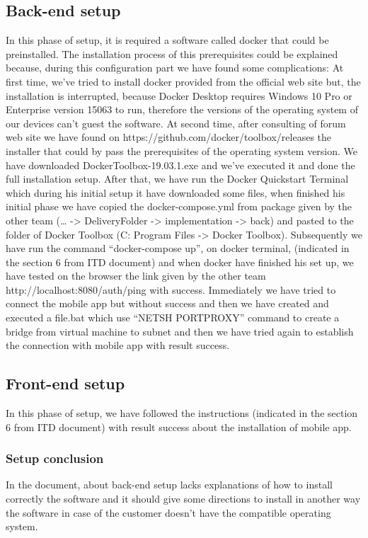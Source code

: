 \subsection{Back-end setup}
In this phase of setup, it is required a software called docker that could be preinstalled. The installation process of this prerequisites could be explained because, during this configuration part we have found some complications: 
At first time, we’ve tried to install docker provided from the official web site but, the installation is interrupted, because Docker Desktop requires Windows 10 Pro or Enterprise version 15063 to run, therefore the versions of the operating system of our devices can’t guest the software. At second time, after consulting of forum web site we have found on https://github.com/docker/toolbox/releases the installer that could by pass the prerequisites of the operating system version. We have downloaded DockerToolbox-19.03.1.exe and we’ve executed it and done the full installation setup. After that, we have run the Docker Quickstart Terminal which during his initial setup it have downloaded some files, when finished his initial phase we have copied the docker-compose.yml from package given by the other team (… -> DeliveryFolder -> implementation -> back) and pasted to the folder of Docker Toolbox (C: Program Files -> Docker Toolbox). Subsequently  we have run the command “docker-compose up”, on docker terminal, (indicated in the section 6 from ITD document) and when docker have finished his set up, we have tested on the browser the link given by the other team http://localhost:8080/auth/ping with success.  Immediately we have tried to connect the mobile app but without success and then we have created and executed a file.bat which use “NETSH PORTPROXY” command to create a bridge from virtual machine to subnet and then we have tried again to establish the connection with mobile app with result success.

\subsection{Front-end setup}
In this phase of setup, we have followed the instructions (indicated in the section 6 from ITD document) with result success about the installation of mobile app.
\subsubsection{Setup conclusion}
In the document, about back-end setup lacks explanations of how to install correctly the software and it should give some directions to install in another way the software in case of the customer doesn’t have the compatible operating system. 









